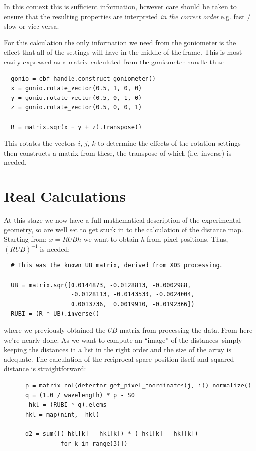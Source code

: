 \documentclass[a4paper, 11pt]{article}
\begin{document}
\noindent
In this context this is sufficient information, however care should be taken to ensure that the resulting properties are interpreted \emph{in the correct order} e.g. fast / slow or vice versa.

For this calculation the only information we need from the goniometer is the effect that all of the settings will have in the middle of the frame. This is most easily expressed as a matrix calculated from the goniometer handle thus:

{\small
\begin{verbatim}
  gonio = cbf_handle.construct_goniometer()
  x = gonio.rotate_vector(0.5, 1, 0, 0)
  y = gonio.rotate_vector(0.5, 0, 1, 0)
  z = gonio.rotate_vector(0.5, 0, 0, 1)

  R = matrix.sqr(x + y + z).transpose()
\end{verbatim}
}

\noindent
This rotates the vectors $i$, $j$, $k$ to determine the effects of the rotation settings then constructs a matrix from these, the transpose of which (i.e. inverse) is needed.

\section{Real Calculations}

At this stage we now have a full mathematical description of the experimental geometry, so are well set to get stuck in to the calculation of the distance map. Starting from: $x = R U B h$ we want to obtain $h$ from pixel positions. Thus, $(R U B)^{-1}$ is needed:

{\small
\begin{verbatim}
  # This was the known UB matrix, derived from XDS processing.

  UB = matrix.sqr([0.0144873, -0.0128813, -0.0002988,
                   -0.0128113, -0.0143530, -0.0024004,
                   0.0013736,  0.0019910, -0.0192366])
  RUBI = (R * UB).inverse()
\end{verbatim}
}

\noindent
where we previously obtained the $U B$ matrix from processing the data. From here we're nearly done. As we want to compute an ``image'' of the distances, simply keeping the distances in a list in the right order and the size of the array is adequate. The calculation of the reciprocal space position itself and squared distance is straightforward:

{\small
\begin{verbatim}
      p = matrix.col(detector.get_pixel_coordinates(j, i)).normalize()
      q = (1.0 / wavelength) * p - S0
      _hkl = (RUBI * q).elems
      hkl = map(nint, _hkl)

      d2 = sum([(_hkl[k] - hkl[k]) * (_hkl[k] - hkl[k])
                for k in range(3)])
\end{verbatim}
}
\end{document}
